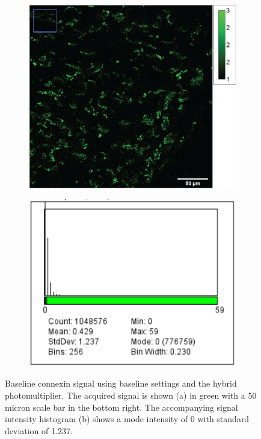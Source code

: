 \documentclass[12pt]{article}
\begin{document}
\begin{figure}[H]
	\begin{subfigure}{.5\textwidth}
		\centering
		\includegraphics[width=.95\linewidth]{FinalFigures/CX43_Baseline.png}
		\caption{}
		\label{fig:cx43_b}
	\end{subfigure}%
	\begin{subfigure}{.5\textwidth}
		\centering
		\includegraphics[width=.95\linewidth]{FinalFigures/CX43_baseline_Hist.png}
		\caption{}
		\label{fig:cx43_b_hist}
	\end{subfigure}
	\caption{Baseline connexin signal using baseline settings and the hybrid photomultiplier. The acquired signal is shown (a) in green with a 50 micron scale bar in the bottom right. The accompanying signal intensity histogram (b) shows a mode intensity of 0 with standard deviation of 1.237.}
	\label{fig:cx43_base}
\end{figure}
\end{document}
